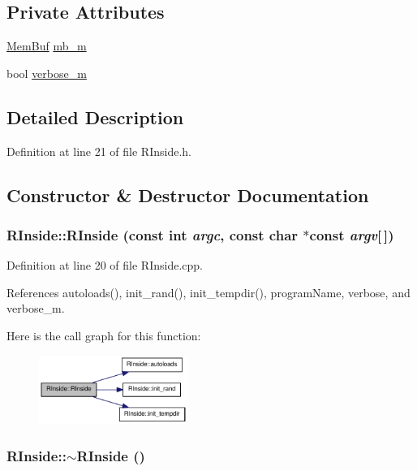 \subsection*{Private Attributes}
\begin{DoxyCompactItemize}
\item 
\hyperlink{classMemBuf}{MemBuf} \hyperlink{classRInside_ad078e52002a242f7f5c94211ca3dd8be}{mb\_\-m}
\item 
bool \hyperlink{classRInside_a186dad3e463fedc586f3d02784a814b2}{verbose\_\-m}
\end{DoxyCompactItemize}


\subsection{Detailed Description}


Definition at line 21 of file RInside.h.

\subsection{Constructor \& Destructor Documentation}
\hypertarget{classRInside_aeecbfd63737539d1731b2f38852b3751}{
\subsubsection[{RInside}]{\setlength{\rightskip}{0pt plus 5cm}RInside::RInside (const int {\em argc}, \/  const char $\ast$const  {\em argv}\mbox{[}$\,$\mbox{]})}}
\label{classRInside_aeecbfd63737539d1731b2f38852b3751}


Definition at line 20 of file RInside.cpp.

References autoloads(), init\_\-rand(), init\_\-tempdir(), programName, verbose, and verbose\_\-m.

Here is the call graph for this function:\nopagebreak
\begin{figure}[H]
\begin{center}
\leavevmode
\includegraphics[width=137pt]{classRInside_aeecbfd63737539d1731b2f38852b3751_cgraph}
\end{center}
\end{figure}
\hypertarget{classRInside_a277fc333d12163eaea9b903711586146}{
\subsubsection[{$\sim$RInside}]{\setlength{\rightskip}{0pt plus 5cm}RInside::$\sim$RInside ()}}
\label{classRInside_a277fc333d12163eaea9b903711586146}


